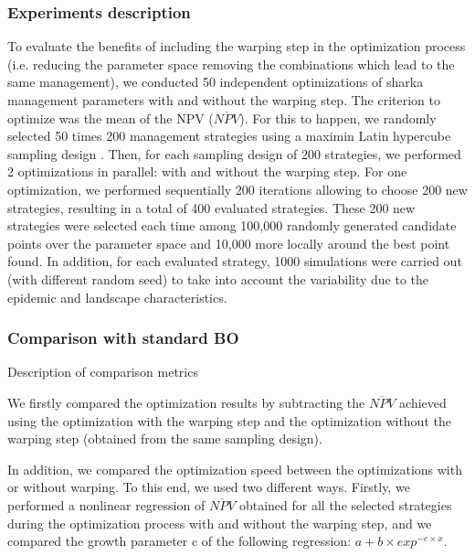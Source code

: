 \subsubsection{Experiments description}

To evaluate the benefits of including the warping step in the optimization process (i.e. reducing the parameter space removing the combinations which lead to the same management), 
we conducted 50 independent optimizations of sharka management parameters with and without the warping step. The criterion to optimize was the mean of the NPV ($\overline{NPV}$).
For this to happen, we randomly selected 50 times 200 management strategies using a maximin Latin hypercube sampling design \cite{fang2005design}. 
Then, for each sampling design of 200 strategies, we performed 2 optimizations in parallel: with and without the warping step. 
For one optimization, we performed sequentially 200 iterations allowing to choose 200 new strategies, resulting in a total of 400 evaluated strategies.
These 200 new strategies were selected each time among 100,000 randomly generated candidate points over the parameter space and 10,000 more locally around the best point found. 
In addition, for each evaluated strategy, 1000 simulations were carried out (with different random seed) to take into account the variability due to the epidemic and landscape characteristics.

\subsubsection{Comparison with standard BO}

Description of comparison metrics



We firstly compared the optimization results by subtracting the $\overline{NPV}$ achieved using the optimization with the warping step and the optimization without the warping step (obtained from the same sampling design). 

In addition, we compared the optimization speed between the optimizations with or without warping. To this end, we used two different ways. 
Firstly, we performed a nonlinear regression of $\overline{NPV}$ obtained for all the selected strategies during the optimization process with 
and without the warping step, and we compared the growth parameter c of the following regression:
$a+b \times exp^{-c\times x}$.

